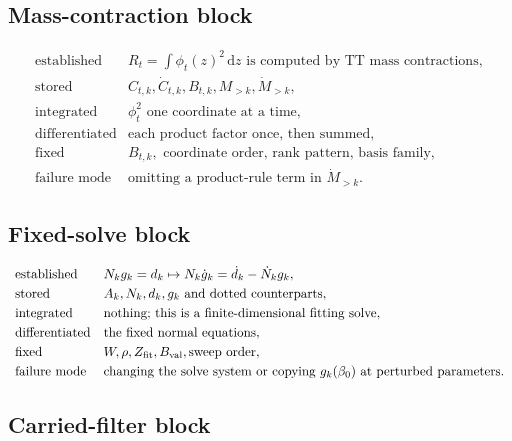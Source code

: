 \documentclass[11pt]{article}
\numberwithin{equation}{section}
\newcommand{\dd}{\,\mathrm d}
\begin{document}
\subsection*{Mass-contraction block}

\begin{equation}
\begin{array}{ll}
\text{established} &
    R_t=\int\phi_t(z)^2\dd z
    \text{ is computed by TT mass contractions},\\[1mm]
\text{stored} &
    C_{t,k},\dot C_{t,k},B_{t,k},M_{>k},\dot M_{>k},\\[1mm]
\text{integrated} &
    \phi_t^2 \text{ one coordinate at a time},\\[1mm]
\text{differentiated} &
    \text{each product factor once, then summed},\\[1mm]
\text{fixed} &
    B_{t,k},\text{ coordinate order, rank pattern, basis family},\\[1mm]
\text{failure mode} &
    \text{omitting a product-rule term in } \dot M_{>k}.
\end{array}
\label{eq:p24-p22-r2}
\end{equation}

\subsection*{Fixed-solve block}

\begin{equation}
\begin{array}{ll}
\text{established} &
    N_k g_k=d_k
    \mapsto
    N_k\dot g_k=\dot d_k-\dot N_k g_k,\\[1mm]
\text{stored} &
    A_k,N_k,d_k,g_k \text{ and dotted counterparts},\\[1mm]
\text{integrated} &
    \text{nothing; this is a finite-dimensional fitting solve},\\[1mm]
\text{differentiated} &
    \text{the fixed normal equations},\\[1mm]
\text{fixed} &
    W,\rho,Z_{\rm fit},B_{\rm val},\text{sweep order},\\[1mm]
\text{failure mode} &
    \text{changing the solve system or copying }g_k(\beta_0)
    \text{ at perturbed parameters.}
\end{array}
\label{eq:p24-p22-r3}
\end{equation}

\subsection*{Carried-filter block}
\end{document}
